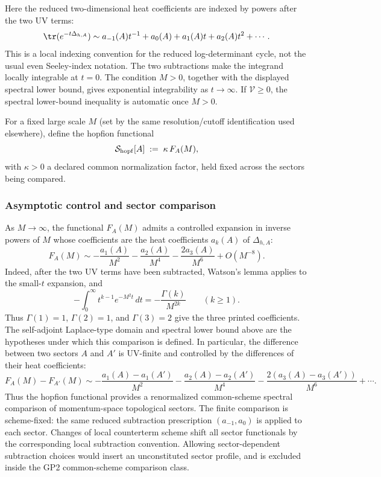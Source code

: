 \documentclass[11pt,a4paper]{article}
\begin{document}
Here the reduced two-dimensional heat coefficients are indexed by powers after the two UV terms:
\[
\tr(e^{-t\Delta_{h,A}})\sim a_{-1}(A)t^{-1}+a_0(A)+a_1(A)t+a_2(A)t^2+\cdots .
\]
This is a local indexing convention for the reduced log-determinant cycle, not the usual even Seeley-index notation.
The two subtractions make the integrand locally integrable at \(t=0\).
The condition \(M>0\), together with the displayed spectral lower bound, gives exponential integrability as \(t\to\infty\).  If \(\mathcal V\ge0\), the spectral lower-bound inequality is automatic once \(M>0\).

\begin{definition}
\label{p3:def:hopfion-functional}
For a fixed large scale \(M\) (set by the same resolution/cutoff identification used elsewhere),
define the hopfion functional
\begin{equation}
\label{p3:eq:Hopfion-functional}
\mathcal{S}_{\rm hopf}[A]\;:=\;\kappa\,F_A(M),
\end{equation}
with \(\kappa>0\) a declared common normalization factor, held fixed across the sectors being compared.
\end{definition}

\subsubsection{Asymptotic control and sector comparison}

As \(M\to\infty\), the functional \(F_A(M)\) admits a controlled expansion in inverse powers of \(M\) whose
coefficients are the heat coefficients \(a_k(A)\) of \(\Delta_{h,A}\):
\begin{equation}
\label{p3:eq:FA-asymp}
F_A(M)\sim -\frac{a_1(A)}{M^2}-\frac{a_2(A)}{M^4}-\frac{2a_3(A)}{M^6}+O(M^{-8}).
\end{equation}
Indeed, after the two UV terms have been subtracted, Watson's lemma applies
to the small-\(t\) expansion, and
\[
 -\int_0^\infty t^{k-1}e^{-M^2t}\,dt
 =-\frac{\Gamma(k)}{M^{2k}}
 \qquad(k\ge1).
\]
Thus \(\Gamma(1)=1\), \(\Gamma(2)=1\), and \(\Gamma(3)=2\) give the
three printed coefficients.  The self-adjoint Laplace-type domain and
spectral lower bound above are the hypotheses under which this comparison is
defined.
In particular, the difference between two sectors \(A\) and \(A'\) is UV-finite and controlled by the
differences of their heat coefficients:
\begin{equation}
\label{p3:eq:FA-diff}
F_A(M)-F_{A'}(M)\sim -\frac{a_1(A)-a_1(A')}{M^2}-\frac{a_2(A)-a_2(A')}{M^4}-\frac{2(a_3(A)-a_3(A'))}{M^6}+\cdots.
\end{equation}
Thus the hopfion functional provides a renormalized common-scheme spectral comparison of momentum-space topological sectors.  The finite comparison is scheme-fixed: the same reduced subtraction prescription \((a_{-1},a_0)\) is applied to each sector.  Changes of local counterterm scheme shift all sector functionals by the corresponding local subtraction convention.  Allowing sector-dependent subtraction choices would insert an unconstituted sector profile, and is excluded inside the GP2 common-scheme comparison class.
\end{document}

